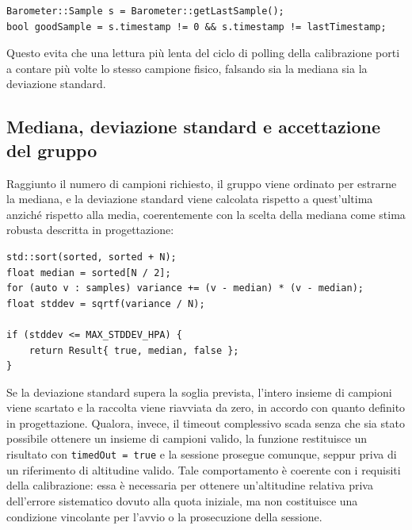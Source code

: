 \begin{listing}[H]
\begin{verbatim}
Barometer::Sample s = Barometer::getLastSample();
bool goodSample = s.timestamp != 0 && s.timestamp != lastTimestamp;
\end{verbatim}
\caption{Filtro dei campioni duplicati tramite confronto del timestamp}
\label{listing:altitude-cal-dedupe}
\end{listing}

Questo evita che una lettura più lenta del ciclo di polling della
calibrazione porti a contare più volte lo stesso campione fisico, falsando
sia la mediana sia la deviazione standard.

\subsection{Mediana, deviazione standard e accettazione del gruppo}
Raggiunto il numero di campioni richiesto, il gruppo viene ordinato per
estrarne la mediana, e la deviazione standard viene calcolata rispetto a
quest'ultima anziché rispetto alla media, coerentemente con la scelta della
mediana come stima robusta descritta in progettazione:

\begin{listing}[H]
\begin{verbatim}
std::sort(sorted, sorted + N);
float median = sorted[N / 2];
for (auto v : samples) variance += (v - median) * (v - median);
float stddev = sqrtf(variance / N);

if (stddev <= MAX_STDDEV_HPA) {
    return Result{ true, median, false };
}
\end{verbatim}
\caption{Calcolo di mediana e deviazione standard, e criterio di accettazione}
\label{listing:altitude-cal-median}
\end{listing}

Se la deviazione standard supera la soglia prevista, l’intero insieme di campioni 
viene scartato e la raccolta viene riavviata da zero, in accordo con quanto definito 
in progettazione. Qualora, invece, il timeout complessivo scada senza che sia stato 
possibile ottenere un insieme di campioni valido, la funzione restituisce un risultato 
con \texttt{timedOut = true} e la sessione prosegue comunque, seppur priva di un 
riferimento di altitudine valido. Tale comportamento è coerente con i requisiti della 
calibrazione: essa è necessaria per ottenere un’altitudine relativa priva dell’errore 
sistematico dovuto alla quota iniziale, ma non costituisce una condizione vincolante 
per l’avvio o la prosecuzione della sessione.  

